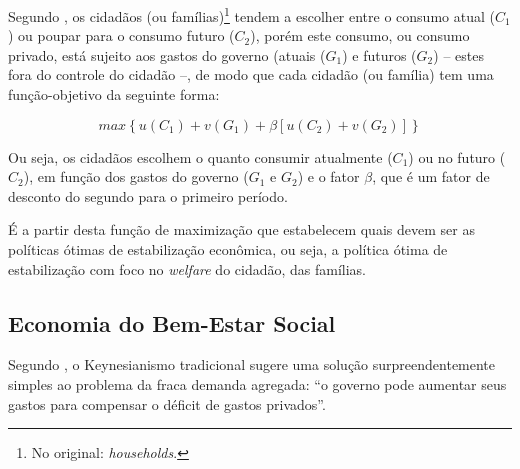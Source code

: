 \documentclass[
	10pt,				%
	openright,			%
	twoside,			%
	a5paper,			%
	english,			%
	french,				%
	spanish,			%
	brazil				%
	]{abntex2}
\begin{document}
Segundo , os cidadãos (ou
famílias)\footnote{No original: \emph{households}.} tendem a escolher
entre o consumo atual (\(C_1\)) ou poupar para o consumo futuro
(\(C_2\)), porém este consumo, ou consumo privado, está sujeito aos
gastos do governo (atuais (\(G_1\)) e futuros (\(G_2\)) -- estes fora do
controle do cidadão --, de modo que cada cidadão (ou família) tem uma
função-objetivo da seguinte forma:

\[max\left \{ u(C_1) + v(G_1) + \beta[u(C_2) + v(G_2)] \right \}\]

Ou seja, os cidadãos escolhem o quanto consumir atualmente (\(C_1\)) ou
no futuro (\(C_2\)), em função dos gastos do governo (\(G_1\) e \(G_2\))
e o fator \(\beta\), que é um fator de desconto do segundo para o
primeiro período.

É a partir desta função de maximização que 
estabelecem quais devem ser as políticas ótimas de estabilização
econômica, ou seja, a política ótima de estabilização com foco no
\emph{welfare} do cidadão, das famílias.

\subsection{Economia do Bem-Estar
Social}\label{economia-do-bem-estar-social}

Segundo , o Keynesianismo tradicional
sugere uma solução surpreendentemente simples ao problema da fraca
demanda agregada: ``o governo pode aumentar seus gastos para compensar o
déficit de gastos privados''.
\end{document}
